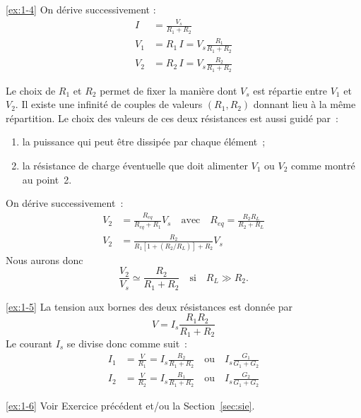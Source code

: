 \begin{solexercise}{\ref{ex:1-4}}
	\label{solex:1-4}
On dérive successivement :
\begin{align*}
I&=\frac{V_s}{R_1+R_2}\\
V_1&=R_1\,I=V_s\frac{R_1}{R_1+R_2}\\
V_2&=R_2\,I=V_s\frac{R_2}{R_1+R_2} 
\end{align*}

Le choix de $R_1$ et $R_2$ permet de fixer la manière dont $V_s$ est
répartie entre $V_1$ et $V_2$. Il existe une infinité de couples de valeurs $(R_1,R_2)$
donnant lieu à la même répartition. Le choix des valeurs de ces deux
résistances est aussi guidé par~:
\begin{enumerate}
	\item la puissance qui peut être dissipée par chaque élément~;
	\item la résistance de charge éventuelle que doit alimenter $V_1$ ou
	$V_2$ comme montré au point~2.
\end{enumerate}
On dérive successivement~:
\begin{align*}
V_2&=\frac{R_{eq}}{R_{eq}+R_1}V_s \quad \text{avec} \quad 
R_{eq}=\frac{R_2 R_L}{R_2 + R_L}\\
V_2 &= \frac{R_2}{R_1[1+ (R_2/R_L)]+R_2}V_s
\end{align*}
Nous aurons donc 
\[\frac{V_2}{V_s}\simeq \frac{R_2}{R_1+R_2} \quad \text{si} \quad R_L \gg R_2.\]
\end{solexercise}

\begin{solexercise}{\ref{ex:1-5}}
	\label{solex:1-5}
La tension aux bornes des deux résistances est donnée par 
\[V=I_s\frac{R_1 R_2}{R_1+R_2}\]
Le courant $I_s$ se divise donc comme suit~:
\begin{align*}
I_1 &=\frac{V}{R_1}=I_s\frac{R_2}{R_1+R_2} \quad \text{ou} \quad
I_s\frac{G_1}{G_1+G_2}\\
I_2 &=\frac{V}{R_2}=I_s\frac{R_1}{R_1+R_2} \quad \text{ou} \quad
I_s\frac{G_2}{G_1+G_2}
\end{align*}
\end{solexercise}

\begin{solexercise}{\ref{ex:1-6}}
	\label{solex:1-6}
Voir Exercice précédent et/ou la Section~\ref{sec:sie}.
\end{solexercise}

